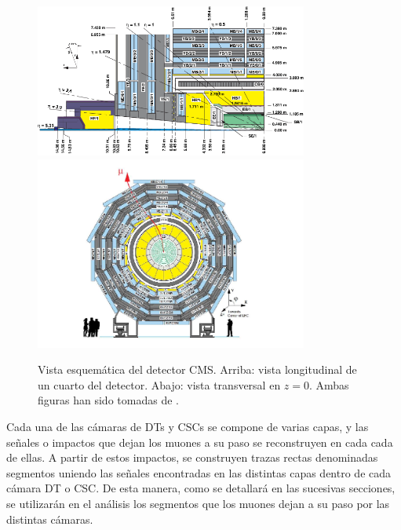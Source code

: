 \begin{figure}
\centering
\includegraphics[width=0.8\textwidth]{figures/CMSview1.png}
\includegraphics[width=0.8\textwidth]{figures/CMSview.png}
\caption{Vista esquem\'atica del detector CMS. Arriba: vista longitudinal de un cuarto del detector. Abajo: vista transversal en $z = 0$. Ambas figuras han sido tomadas de \cite{DTperformance}.}
\label{fig:CMSsub}
\end{figure}


Cada una de las c\'amaras de DTs y CSCs se compone de varias capas, y las se\~nales o impactos que dejan los muones a su paso se reconstruyen en cada cada de ellas. A partir de estos impactos, se construyen trazas rectas denominadas segmentos uniendo las se\~nales encontradas en las distintas capas dentro de cada c\'amara DT o CSC. De esta manera, como se detallar\'a en las sucesivas secciones, se utilizar\'an en el an\'alisis los segmentos que los muones dejan a su paso por las distintas c\'amaras.

\clearpage
